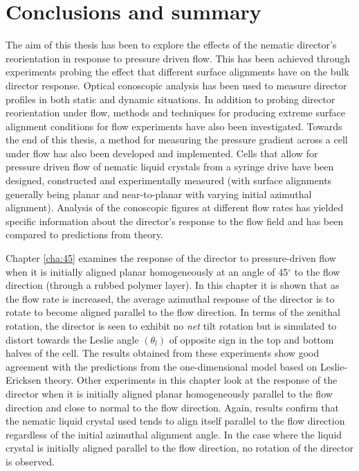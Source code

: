 \chapter{Conclusions and summary}
\label{cha:conclusions}
The aim of this thesis has been to explore the effects of the nematic director's reorientation in response to pressure driven flow. This has been achieved through experiments probing the effect that different surface alignments have on the bulk director response. Optical conoscopic analysis has been used to measure director profiles in both static and dynamic situations. In addition to probing director reorientation under flow, methods and techniques for producing extreme surface alignment conditions for flow experiments have also been investigated. Towards the end of this thesis, a method for measuring the pressure gradient across a cell under flow has also been developed and implemented. Cells that allow for pressure driven flow of nematic liquid crystals from a syringe drive have been designed, constructed and experimentally measured (with surface alignments generally being planar and near-to-planar with varying initial azimuthal alignment). Analysis of the conoscopic figures at different flow rates has yielded specific information about the director's response to the flow field and has been compared to predictions from theory. 

Chapter \ref{cha:45} examines the response of the director to pressure-driven flow when it is initially aligned planar homogeneously at an angle of 45$^{\circ}$ to the flow direction (through a rubbed polymer layer). In this chapter it is shown that as the flow rate is increased, the average azimuthal response of the director is to rotate to become aligned parallel to the flow direction. In terms of the zenithal rotation, the director is seen to exhibit no \textit{net} tilt rotation but is simulated to distort towards the Leslie angle $\left(\theta_l\right)$ of opposite sign in the top and bottom halves of the cell. The results obtained from these experiments show good agreement with the predictions from the one-dimensional model based on Leslie-Ericksen theory. Other experiments in this chapter look at the response of the director when it is initially aligned planar homogeneously parallel to the flow direction and close to normal to the flow direction. Again, results confirm that the nematic liquid crystal used tends to align itself parallel to the flow direction regardless of the initial azimuthal alignment angle. In the case where the liquid crystal is initially aligned parallel to the flow direction, no rotation of the director is observed.

